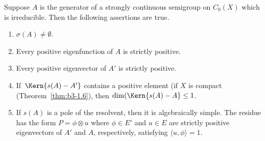 \begin{proposition}\label{prop:b3-3.5}
	Suppose $A$ is the generator of a strongly continuous semigroup on $C_{0}(X)$ which is irreducible.
	Then the following assertions are true.
	\begin{enumerate}[\upshape (i)]
		\item 
		$\sigma(A) \neq \emptyset$.
		
		\item 
		Every positive eigenfunction of\/ $A$ is strictly positive.
		
		\item 
		Every positive eigenvector of\/ $A'$ is strictly positive.
		
		\item 
		If\ $\Kern{s(A) - A'}$ contains a positive element (\eg if\/ $X$ is compact (\cf Theorem~\ref{thm:b3-1.6}), then $\dim(\Kern{s(A) - A} \leq 1$.
		
		\item 
        
		If\/ $s(A)$ is a pole of the resolvent, then it is algebraically simple.
		The residue has the form $P = \phi \otimes u$ where $\phi \in E'$ and $u \in E$ are strictly positive eigenvectors of\/ $A'$ and $A$, respectively, satisfying $\langle u,\phi\rangle = 1$.
	\end{enumerate}
\end{proposition}
